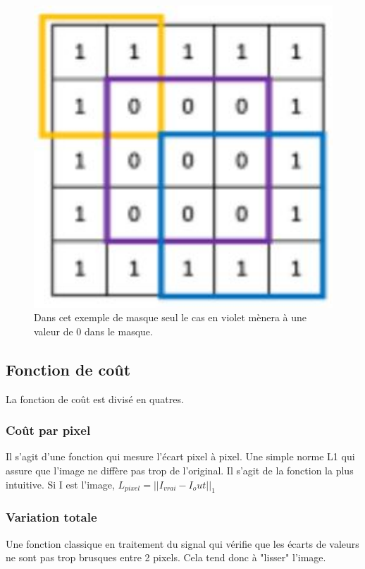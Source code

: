 \begin{figure}[!h]
    \centering
    \includegraphics[width= 400pt,valign=t]{"images/Image_inpainting/val0masque"}
    \caption{Dans cet exemple de masque seul le cas en violet mènera à une valeur de 0 dans le masque.}
\end{figure}


\subsection{Fonction de coût}
La fonction de coût est divisé en quatres.
\subsubsection{Coût par pixel}
Il s'agit d'une fonction qui mesure l'écart pixel à pixel. Une simple norme L1 qui assure que l'image ne diffère pas trop de l'original. Il s'agit de la fonction la plus intuitive. Si I est l'image, $L_{pixel} = ||I_{vrai} - {I_out}||_1$
\subsubsection{Variation totale}
Une fonction classique en traitement du signal qui vérifie que les écarts de valeurs ne sont pas trop brusques entre 2 pixels. Cela tend donc à "lisser" l'image.
